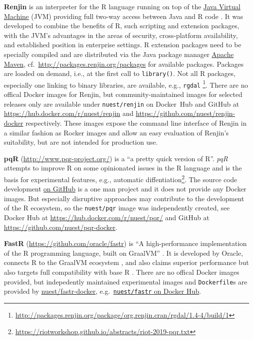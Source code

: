 \textbf{Renjin} is an interpreter for the R language running on top of
the \href{https://en.wikipedia.org/wiki/Java_virtual_machine}{Java
Virtual Machine} (JVM) providing full two-way access between Java and R
code \citep{wikipedia_renjin_2018}. It was developed to combine the
benefits of R, such scripting and extension packages, with the JVM's
advantages in the areas of security, cross-platform availability, and
established position in enterprise settings. R extension packages need
to be specially compiled and are distributed via the Java package
manager \href{https://en.wikipedia.org/wiki/Apache_Maven}{Apache Maven},
cf.~\url{http://packages.renjin.org/packages} for available packages.
Packages are loaded on demand, i.e., at the first call to
\texttt{library()}. Not all R packages, especially one linking to binary
libraries, are available, e.g., \texttt{rgdal}
\footnote{\href{http://packages.renjin.org/package/org.renjin.cran/rgdal/1.4-4/build/1}{http://packages.renjin.org/package/org.renjin.cran/rgdal/1.4-4/build/1}}.
There are no offical Docker images for Renjin, but community-maintained
images for selected releases only are available under
\texttt{nuest/renjin} on Docker~Hub and GitHub at
\url{https://hub.docker.com/r/nuest/renjin} and
\url{https://github.com/nuest/renjin-docker} respectively. These images
expose the command line interface of Renjin in a similar fashion as
Rocker images and allow an easy evaluation of Renjin's suitability, but
are not intended for production use.

\textbf{pqR} (\url{http://www.pqr-project.org/}) is a ``a pretty quick
version of R''. \emph{pqR} attempts to improve R on some opinionated
issues in the R language and is the basis for experimental features,
e.g., automatic
diffentiation\footnote{\href{https://riotworkshop.github.io/abstracts/riot-2019-pqr.txt}{https://riotworkshop.github.io/abstracts/riot-2019-pqr.txt}}.
The source code development
\href{https://github.com/radfordneal/pqR/}{on GitHub} is a one man
project and it does not provide any Docker images. But especially
disruptive approaches may contribute to the development of the R
ecosystem, so the \texttt{nuest/pqr} image was independently created,
see Docker Hub at \url{https://hub.docker.com/r/nuest/pqr/} and GitHub
at \url{https://github.com/nuest/pqr-docker}.

\textbf{FastR} (\url{https://github.com/oracle/fastr}) is ``A
high-performance implementation of the R programming language, built on
GraalVM'' \citep{oracle_labs_oraclefastr_2020}. It is developed by
Oracle, connects R to the GraalVM ecosystem
\citep{wikipedia_graalvm_2019}, and also claims superior performance but
also targets full compatibility with base R
\citep{oracle_labs_oraclefastr_2020}. There are no offical Docker images
provided, but indepedently maintained experimental images and
\texttt{Dockerfile}s are provided by
\href{https://github.com/nuest/fastr-docker}{nuest/fastr-docker},
e.g.~\href{https://cloud.docker.com/repository/docker/nuest/fastr/}{\texttt{nuest/fastr}
on Docker Hub}.

